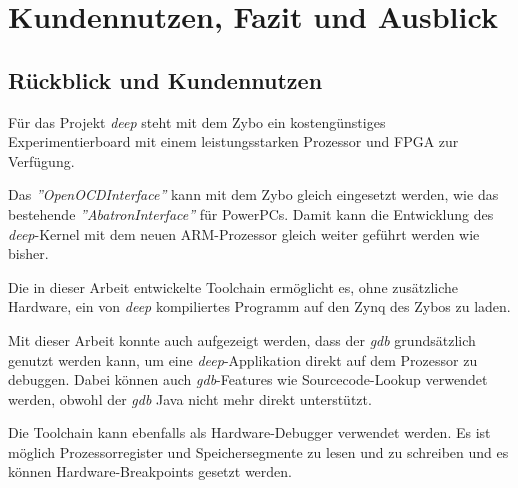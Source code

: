 \chapter{Kundennutzen, Fazit und Ausblick}
\section{Rückblick und Kundennutzen}
Für das Projekt \textit{deep} steht mit dem Zybo ein kostengünstiges Experimentierboard mit einem leistungsstarken Prozessor und FPGA zur Verfügung.

Das \textit{''OpenOCDInterface''} kann mit dem Zybo gleich eingesetzt werden, wie das bestehende \textit{''AbatronInterface''} für PowerPCs.
Damit kann die Entwicklung des \textit{deep}-Kernel mit dem neuen ARM-Prozessor gleich weiter geführt werden wie bisher.

Die in dieser Arbeit entwickelte Toolchain ermöglicht es, ohne zusätzliche Hardware, ein von \textit{deep} kompiliertes Programm auf den Zynq des Zybos zu laden.

Mit dieser Arbeit konnte auch aufgezeigt werden, dass der \textit{gdb} grundsätzlich genutzt werden kann, um eine \textit{deep}-Applikation direkt auf dem Prozessor zu debuggen.
Dabei können auch \textit{gdb}-Features wie Sourcecode-Lookup verwendet werden, obwohl der \textit{gdb} Java nicht mehr direkt unterstützt.

Die Toolchain kann ebenfalls als Hardware-Debugger verwendet werden.
Es ist möglich Prozessorregister und Speichersegmente zu lesen und zu schreiben und es können Hardware-Breakpoints gesetzt werden.



